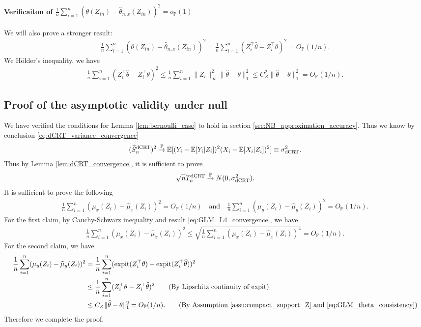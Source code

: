 \documentclass[12pt]{article}
\theoremstyle{definition}
\def\P{\mathbb{P}}
\def\P{\mathbb{P}}
\newcommand{\E}{\mathbb E}								%
\renewcommand{\P}{\mathbb{P}}							%
\newcommand{\expit}{\mathrm{expit}}                 	%
\newcommand{\convp}{\overset{\mathbb{P}}{\rightarrow}}             %
\newcommand{\srx}{X}									%
\newcommand{\srz}{Z}									%
\newcommand{\sry}{Y}									%
\newcommand{\dCRT}{\textnormal{dCRT}} 					%
\begin{document}
\paragraph{Verificaiton of $\frac{1}{n}\sum_{i=1}^n (\theta(\srz_{in})-\widehat \theta_{n,x}(\srz_{in}))^{2}=o_{\P}(1)$}

We will also prove a stronger result:
\begin{align*}
  \frac{1}{n}\sum_{i=1}^n (\theta(\srz_{in})-\widehat \theta_{n,x}(\srz_{in}))^{2}=\frac{1}{n}\sum_{i=1}^n (\srz_i^\top\widehat{\theta}-\srz_i^\top\theta)^{2}=O_{\P}(1/n).
\end{align*}
We H\"older's inequality, we have 
\begin{align*}
  \frac{1}{n}\sum_{i=1}^n (\srz_i^\top\widehat{\theta}-\srz_i^\top\theta)^{2}\leq \frac{1}{n}\sum_{i=1}^n\|\srz_i\|_{\infty}^2\|\widehat{\theta}-\theta\|_1^2\leq C_Z^2\|\widehat{\theta}-\theta\|_1^2=O_{\P}(1/n).
\end{align*}

\subsection{Proof of the asymptotic validity under null}

We have verified the conditions for Lemma \ref{lem:bernoulli_case} to hold in section \ref{sec:NB_approximation_accuracy}. Thus we know by conclusion \eqref{eq:dCRT_variance_convergence}
\begin{align*}
  (\widehat{S}_n^{\dCRT})^2\convp \E[(\sry_{i}-\E[\sry_i|\srz_i])^2(\srx_{i}-\E[\srx_i|\srz_i])^2]\equiv \sigma_{\dCRT}^2.
\end{align*}
Thus by Lemma \ref{lem:dCRT_convergence}, it is sufficient to prove 
\begin{align*}
  \sqrt{n}T_n^{\dCRT}\convp N(0,\sigma_{\dCRT}^2).
\end{align*}
It is sufficient to prove the following
\begin{align*}
  \frac{1}{n}\sum_{i=1}^n(\mu_x(\srz_i)-\widehat{\mu}_x(\srz_i))^2=O_\P(1/n)\quad\text{and}\quad\frac{1}{n}\sum_{i=1}^n(\mu_y(\srz_i)-\widehat{\mu}_y(\srz_i))^2=O_\P(1/n).
\end{align*}
For the first claim, by Cauchy-Schwarz inequality and result \eqref{eq:GLM_L4_convergence}, we have
\begin{align*}
  \frac{1}{n}\sum_{i=1}^n(\mu_x(\srz_i)-\widehat{\mu}_x(\srz_i))^2\leq\sqrt{\frac{1}{n}\sum_{i=1}^n(\mu_x(\srz_i)-\widehat{\mu}_x(\srz_i))^4}=O_{\P}(1/n).
\end{align*}
For the second claim, we have 
\begin{align*}
  \frac{1}{n}\sum_{i=1}^n(\mu_y(\srz_i)-\widehat{\mu}_y(\srz_i))^2
  &
  =\frac{1}{n}\sum_{i=1}^n(\expit(\srz_i^\top\theta)-\expit(\srz_i^\top\widehat\theta))^2\\
  &
  \leq \frac{1}{n}\sum_{i=1}^n(\srz_i^\top\theta-\srz_i^\top\widehat\theta)^2\tag{By Lipschitz continuity of $\expit$}\\
  &
  \leq C_Z\|\widehat{\theta}-\theta\|_1^2=O_{\P}(1/n).\tag{By Assumption \ref{assu:compact_support_Z} and \eqref{eq:GLM_theta_consistency}}
\end{align*}
Therefore we complete the proof.
\end{document}
